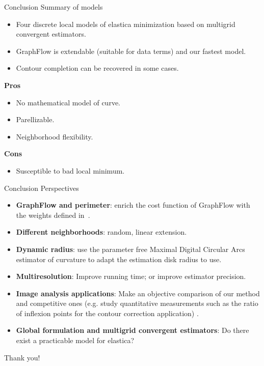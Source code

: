 \begin{frame}
{Conclusion}
{Summary of models}

\begin{itemize}
\item{Four discrete local models of elastica minimization based on multigrid convergent estimators.}
\pause
\item{GraphFlow is extendable (suitable for data terms) and our fastest model.}
\pause
\item{Contour completion can be recovered in some cases.}
\pause
\end{itemize}

\textbf{Pros}
\begin{itemize}
\item{No mathematical model of curve.}
\pause
\item{Parellizable.}
\pause
\item{Neighborhood flexibility.}
\pause
\end{itemize}

\textbf{Cons}
\begin{itemize}
\item{Susceptible to bad local minimum.}
\end{itemize}

\end{frame}

\begin{frame}
{Conclusion}
{Perspectives}

\begin{itemize}
\item{\textbf{GraphFlow and perimeter}: enrich the cost function of GraphFlow with the weights defined in~. }
\pause
\item{\textbf{Different neighborhoods}: random, linear extension.}
\pause
\item{\textbf{Dynamic radius}: use the parameter free Maximal Digital Circular Arcs estimator of curvature to adapt the estimation disk radius to use.}
\pause
\item{\textbf{Multiresolution}: Improve running time; or improve estimator precision.}
\pause
\item{\textbf{Image analysis applications}: Make an objective comparison of our method and competitive ones (e.g. study quantitative measurements such as the ratio of inflexion points for the contour correction application) .}
\pause
\item{\textbf{Global formulation and multigrid convergent estimators}: Do there exist a practicable model for elastica?}
\end{itemize}

\end{frame}

\begin{frame}
\huge
\center
Thank you!
\end{frame}
